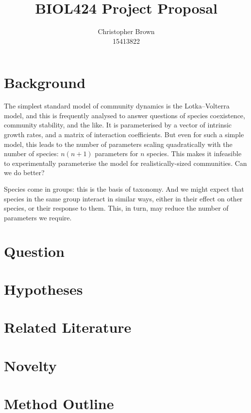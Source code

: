 \documentclass[a4paper,11pt]{article}
\title{BIOL424 Project Proposal}
\author{
	Christopher Brown\\15413822
}
\date{}
\begin{document}
\maketitle

\section{Background}

The simplest standard model of community dynamics is the Lotka--Volterra model, and this is frequently analysed to answer questions of species coexistence, community stability, and the like.
It is parameterised by a vector of intrinsic growth rates, and a matrix of interaction coefficients.
But even for such a simple model, this leads to the number of parameters scaling quadratically with the number of species: $n(n+1)$ parameters for $n$ species.
This makes it infeasible to experimentally parameterise the model for realistically-sized communities.
Can we do better?

Species come in groups: this is the basis of taxonomy.
And we might expect that species in the same group interact in similar ways, either in their effect on other species, or their response to them.
This, in turn, may reduce the number of parameters we require.

\section{Question}

\section{Hypotheses}

\section{Related Literature}

\section{Novelty}

\section{Method Outline}

\FloatBarrier
\printbibliography
\end{document}
